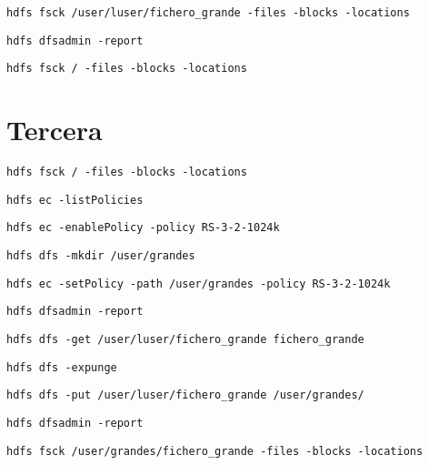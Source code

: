 \documentclass[10pt]{opticajnl}
\begin{document}
\begin{lstlisting}[style=terminal]
    hdfs fsck /user/luser/fichero_grande -files -blocks -locations
\end{lstlisting}

\begin{lstlisting}[style=terminal]
    hdfs dfsadmin -report
\end{lstlisting}

\begin{lstlisting}[style=terminal]
    hdfs fsck / -files -blocks -locations
\end{lstlisting}


\section{Tercera}

\begin{lstlisting}[style=terminal]
    hdfs fsck / -files -blocks -locations
\end{lstlisting}

\begin{lstlisting}[style=terminal]
    hdfs ec -listPolicies
\end{lstlisting}

\begin{lstlisting}[style=terminal]
    hdfs ec -enablePolicy -policy RS-3-2-1024k
\end{lstlisting}

\begin{lstlisting}[style=terminal]
    hdfs dfs -mkdir /user/grandes
\end{lstlisting}

\begin{lstlisting}[style=terminal]
    hdfs ec -setPolicy -path /user/grandes -policy RS-3-2-1024k
\end{lstlisting}

\begin{lstlisting}[style=terminal]
    hdfs dfsadmin -report
\end{lstlisting}

\begin{lstlisting}[style=terminal]
    hdfs dfs -get /user/luser/fichero_grande fichero_grande
\end{lstlisting}

\begin{lstlisting}[style=terminal]
    hdfs dfs -expunge
\end{lstlisting}

\begin{lstlisting}[style=terminal]
    hdfs dfs -put /user/luser/fichero_grande /user/grandes/
\end{lstlisting}

\begin{lstlisting}[style=terminal]
    hdfs dfsadmin -report
\end{lstlisting}

\begin{lstlisting}[style=terminal]
    hdfs fsck /user/grandes/fichero_grande -files -blocks -locations
\end{lstlisting}
\end{document}
